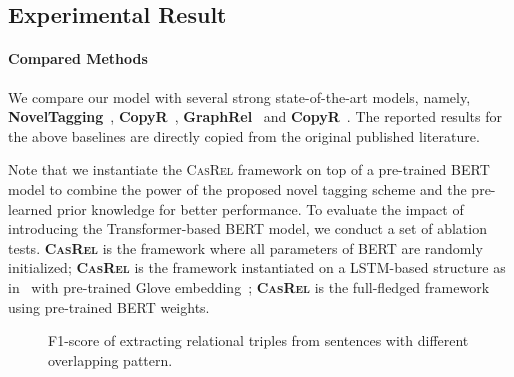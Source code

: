 \documentclass[11pt,a4paper]{article}
\begin{document}
\subsection{Experimental Result}
\paragraph{Compared Methods}
We compare our model with several strong state-of-the-art models, namely, \textbf{NovelTagging}~\cite{zheng2017Joint}, \textbf{CopyR}~\cite{zeng2018Extracting}, \textbf{GraphRel}~\cite{fu2019GraphRel} and \textbf{CopyR}~\cite{zeng2019Learning}. The reported results for the above baselines are directly copied from the original published literature.

\par Note that we instantiate the \textsc{CasRel} framework on top of a pre-trained BERT model to combine the power of the proposed novel tagging scheme and the pre-learned prior knowledge for better performance. To evaluate the impact of introducing the Transformer-based BERT model, we conduct a set of ablation tests.
\textbf{\textsc{CasRel}} is the framework where all parameters of BERT are randomly initialized; 
\textbf{\textsc{CasRel}} is the framework instantiated on a LSTM-based structure as in~\citep{zheng2017Joint} with pre-trained Glove embedding~\citep{pennington2014Glove}; 
\textbf{\textsc{CasRel}} is the full-fledged framework using pre-trained BERT weights. 

\begin{figure*} [!t]
	\centering
	\caption{F1-score of extracting relational triples from sentences with different overlapping pattern.}
	\label{fig:result_type}
\end{figure*}
\end{document}
